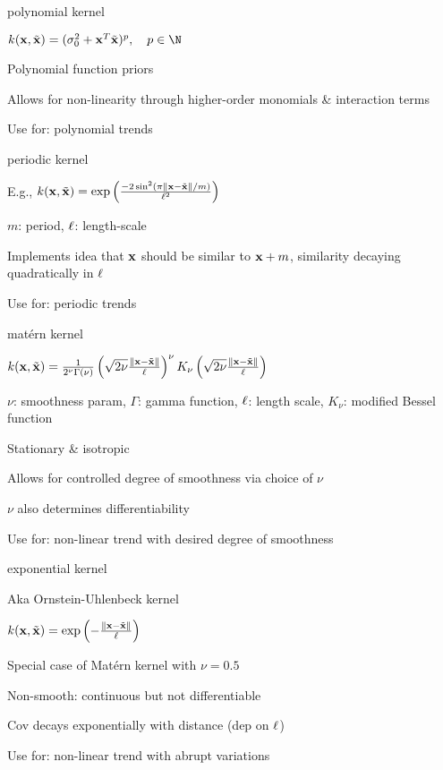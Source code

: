 \documentclass[11pt,compress,t,notes=noshow, xcolor=table]{beamer}
\begin{document}
\begin{framei}{polynomial kernel}
\item $k(\xv, \tilde{\xv}) = (\sigma^2_0 + \xv^T \tilde{\xv} )^p, \quad p \in \N$
\item Polynomial function priors
\item Allows for non-linearity through higher-order monomials \& interaction terms
\item Use for: polynomial trends
\end{framei}

\begin{framei}{periodic kernel}
\item E.g., $k(\mathbf{x}, \tilde{\mathbf{x}}) = \exp \left(\frac{-2\sin^2 (\pi \| \mathbf{x} - \tilde{\mathbf{x}}\| / m)}{\ell^2} \right)$
\item $m$: period, $\ell$: length-scale
\item Implements idea that $\mathbf{x}$ should be similar to $\mathbf{x} + m$, similarity decaying quadratically in $\ell$
\item Use for: periodic trends
\end{framei}

\begin{framei}{matérn kernel}
\item $k(\mathbf{x}, \tilde{\mathbf{x}}) = \frac{1}{2^\nu \Gamma(\nu)} \left( \sqrt{2 \nu} \frac{\| \mathbf{x} - \tilde{\mathbf{x}} \|}{\ell} \right)^\nu K_\nu \left( \sqrt{2 \nu} \frac{\| \mathbf{x} - \tilde{\mathbf{x}} \|}{\ell} \right)$
\item $\nu$: smoothness param, $\Gamma$: gamma function, $\ell$: length scale, $K_\nu$: modified Bessel function
\item Stationary \& isotropic
\item Allows for controlled degree of smoothness via choice of $\nu$
\item $\nu$ also determines differentiability
\item Use for: non-linear trend with desired degree of smoothness
\end{framei}

\begin{framei}{exponential kernel}
\item Aka Ornstein-Uhlenbeck kernel
\item $k(\mathbf{x}, \tilde{\mathbf{x}}) = \exp \left(-\frac{\| \mathbf{x} - \tilde{\mathbf{x}} \|}{\ell} \right)$
\item Special case of Matérn kernel with $\nu = 0.5$
\item Non-smooth: continuous but not differentiable
\item Cov decays exponentially with distance (dep on $\ell$)
\item Use for: non-linear trend with abrupt variations
\end{framei}
\end{document}
